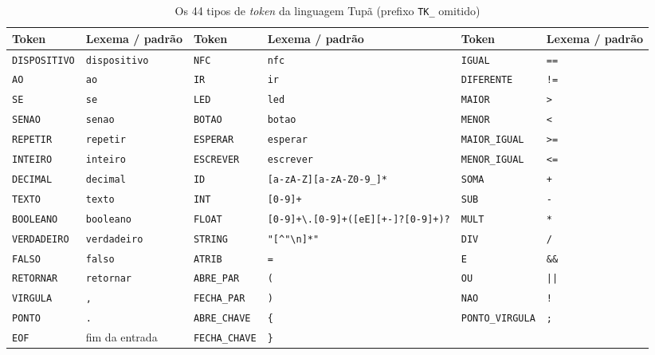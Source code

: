 \documentclass[conference]{IEEEtran}
\begin{document}
\begin{table}[htbp]
\caption{Os 44 tipos de \textit{token} da linguagem Tupã (prefixo \texttt{TK\_} omitido)}
\begin{center}
\setlength{\tabcolsep}{4pt}
\footnotesize
\begin{tabular}{llllll}
\toprule
\textbf{Token} & \textbf{Lexema / padrão} & \textbf{Token} & \textbf{Lexema / padrão} & \textbf{Token} & \textbf{Lexema / padrão} \\
\midrule
\texttt{DISPOSITIVO} & \texttt{dispositivo} & \texttt{NFC} & \texttt{nfc} & \texttt{IGUAL} & \texttt{==} \\
\texttt{AO} & \texttt{ao} & \texttt{IR} & \texttt{ir} & \texttt{DIFERENTE} & \texttt{!=} \\
\texttt{SE} & \texttt{se} & \texttt{LED} & \texttt{led} & \texttt{MAIOR} & \texttt{>} \\
\texttt{SENAO} & \texttt{senao} & \texttt{BOTAO} & \texttt{botao} & \texttt{MENOR} & \texttt{<} \\
\texttt{REPETIR} & \texttt{repetir} & \texttt{ESPERAR} & \texttt{esperar} & \texttt{MAIOR\_IGUAL} & \texttt{>=} \\
\texttt{INTEIRO} & \texttt{inteiro} & \texttt{ESCREVER} & \texttt{escrever} & \texttt{MENOR\_IGUAL} & \texttt{<=} \\
\texttt{DECIMAL} & \texttt{decimal} & \texttt{ID} & \texttt{[a-zA-Z][a-zA-Z0-9\_]*} & \texttt{SOMA} & \texttt{+} \\
\texttt{TEXTO} & \texttt{texto} & \texttt{INT} & \texttt{[0-9]+} & \texttt{SUB} & \texttt{-} \\
\texttt{BOOLEANO} & \texttt{booleano} & \texttt{FLOAT} & \texttt{[0-9]+\textbackslash.[0-9]+([eE][+-]?[0-9]+)?} & \texttt{MULT} & \texttt{*} \\
\texttt{VERDADEIRO} & \texttt{verdadeiro} & \texttt{STRING} & \texttt{"[\^{}"\textbackslash n]*"} & \texttt{DIV} & \texttt{/} \\
\texttt{FALSO} & \texttt{falso} & \texttt{ATRIB} & \texttt{=} & \texttt{E} & \texttt{\&\&} \\
\texttt{RETORNAR} & \texttt{retornar} & \texttt{ABRE\_PAR} & \texttt{(} & \texttt{OU} & \texttt{||} \\
\texttt{VIRGULA} & \texttt{,} & \texttt{FECHA\_PAR} & \texttt{)} & \texttt{NAO} & \texttt{!} \\
\texttt{PONTO} & \texttt{.} & \texttt{ABRE\_CHAVE} & \texttt{\{} & \texttt{PONTO\_VIRGULA} & \texttt{;} \\
\texttt{EOF} & fim da entrada & \texttt{FECHA\_CHAVE} & \texttt{\}} & & \\
\bottomrule
\end{tabular}
\label{tab:tokens}
\end{center}
\end{table}
\end{document}
